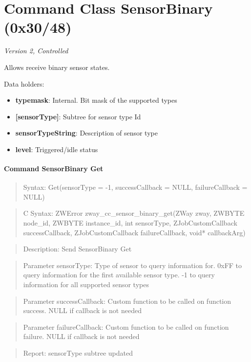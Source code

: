 \section{Command Class SensorBinary (0x30/48)}

\textit{Version 2, Controlled}
\newline

Allows receive binary sensor states.
\newline

\noindent
Data holders:

\begin{itemize}
\item \textbf{typemask}: Internal. Bit mask of the supported types
\item \textbf{[sensorType]}: Subtree for sensor type Id
\item \qquad\textbf{sensorTypeString}: Description of sensor type
\item \qquad\textbf{level}: Triggered/idle status
\end{itemize}

\paragraph{Command SensorBinary Get}
\begin{quote}Syntax: Get(sensorType = -1, successCallback = NULL, failureCallback = NULL)\end{quote}
\begin{quote}C Syntax: ZWError zway\_cc\_sensor\_binary\_get(ZWay zway, ZWBYTE node\_id, ZWBYTE instance\_id, int sensorType, ZJobCustomCallback successCallback, ZJobCustomCallback failureCallback, void* callbackArg)\end{quote}
\begin{quote}Description: Send SensorBinary Get\end{quote}
\begin{quote}Parameter sensorType: Type of sensor to query information for. 0xFF to query information for the first available sensor type. -1 to query information for all supported sensor types\end{quote}
\begin{quote}Parameter successCallback: Custom function to be called on function success. NULL if callback is not needed\end{quote}
\begin{quote}Parameter failureCallback: Custom function to be called on function failure. NULL if callback is not needed\end{quote}
\begin{quote}Report: sensorType subtree updated\end{quote}


